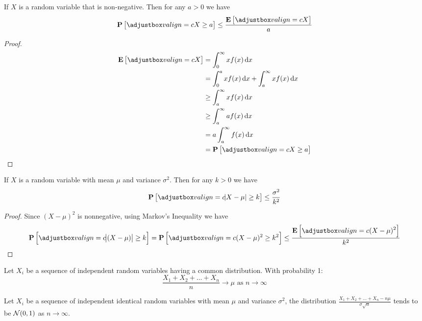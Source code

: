 \begin{theorem}
If $X$ is a random variable that is non-negative. Then for any $a > 0$ we have 
\begin{equation}
    \probability{X \geq a} \leq \frac{\expect{X}}{a}
\end{equation}    
\end{theorem}
\begin{proof}
    \begin{equation*}
        \begin{aligned}
            \expect{X} &= \int_0^\infty x f(x) \dif{x} \\
            &= \int_0^a x f(x) \dif{x} + \int_a^\infty x f(x) \dif{x} \\
            & \geq \int_a^\infty x f(x) \dif{x} \\
            & \geq \int_a^\infty a f(x) \dif{x} \\
            &= a \int_a^\infty f(x) \dif{x} \\
            &= \probability{X \geq a}
        \end{aligned}
    \end{equation*}
\end{proof}

\begin{theorem}
    If $X$ is a random variable with mean $\mu$ and variance $\sigma^2$. Then for any $k > 0$ we have
    \begin{equation}
        \probability{\absolutevalue{X - \mu} \geq k } \leq \frac{\sigma^2}{k^2}
    \end{equation}
\end{theorem}
\begin{proof}
    Since $(X - \mu)^2$ is nonnegative, using Markov's Inequality we have
    \begin{equation*}
        \probability{\absolutevalue{(X - \mu)} \geq k} = \probability{(X - \mu)^2 \geq k^2} \leq \frac{\expect{(X-\mu)^2}}{k^2}
    \end{equation*}
\end{proof}

\begin{theorem}
    Let $X_i$ be a sequence of independent random variables having a common distribution. With probability 1:
    \begin{equation}
        \frac{X_1 + X_2 + \dots + X_n}{n} \rightarrow \mu \text{ as } n \rightarrow \infty
    \end{equation}
\end{theorem}

\begin{theorem}
    Let $X_i$ be a sequence of independent identical random variables with mean $\mu$ and variance $\sigma^2$, the distribution $\displaystyle \frac{X_1 + X_2 + \dots + X_n - n \mu}{\sigma \sqrt{n}}$ tends to be $\mathcal{N}(0,1)$ as $n \rightarrow \infty$.
\end{theorem}






